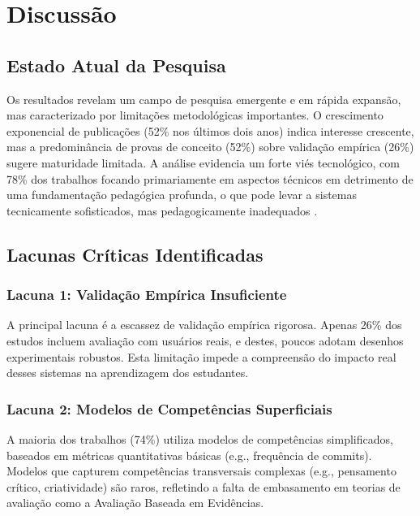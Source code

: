 \documentclass[english, spanish, brazilian]{RBIEarticle} %
\begin{document}
\section{Discussão}

\subsection{Estado Atual da Pesquisa}

Os resultados revelam um campo de pesquisa emergente e em rápida expansão, mas caracterizado por limitações metodológicas importantes. O crescimento exponencial de publicações (52\% nos últimos dois anos) indica interesse crescente, mas a predominância de provas de conceito (52\%) sobre validação empírica (26\%) sugere maturidade limitada. A análise evidencia um forte viés tecnológico, com 78\% dos trabalhos focando primariamente em aspectos técnicos em detrimento de uma fundamentação pedagógica profunda, o que pode levar a sistemas tecnicamente sofisticados, mas pedagogicamente inadequados \parencite{Gibson1977}.

\subsection{Lacunas Críticas Identificadas}

\subsubsection{Lacuna 1: Validação Empírica Insuficiente}

A principal lacuna é a escassez de validação empírica rigorosa. Apenas 26\% dos estudos incluem avaliação com usuários reais, e destes, poucos adotam desenhos experimentais robustos. Esta limitação impede a compreensão do impacto real desses sistemas na aprendizagem dos estudantes.

\subsubsection{Lacuna 2: Modelos de Competências Superficiais}

A maioria dos trabalhos (74\%) utiliza modelos de competências simplificados, baseados em métricas quantitativas básicas (e.g., frequência de commits). Modelos que capturem competências transversais complexas (e.g., pensamento crítico, criatividade) são raros, refletindo a falta de embasamento em teorias de avaliação como a Avaliação Baseada em Evidências.
\end{document}
